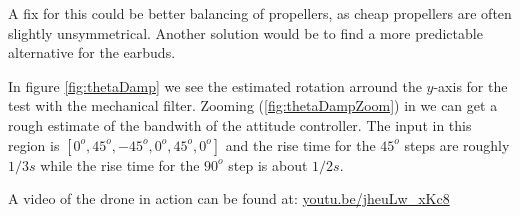 A fix for this could be better balancing of propellers, as cheap propellers are
often slightly unsymmetrical. Another solution would be to find a more
predictable alternative for the earbuds.

In figure \ref{fig:thetaDamp} we see the estimated rotation arround the
$y$-axis for the test with the mechanical filter. Zooming
(\ref{fig:thetaDampZoom}) in we can get a rough estimate of the bandwith of the
attitude controller. The input in this region is $[0^o, 45^o, -45^o, 0^o, 45^o,
0^o]$ and the rise time for the $45^o$ steps are roughly $1/3 s$ while the rise
time for the $90^o$ step is about $1/2 s$.



A video of the drone in action can be found at: \url{youtu.be/jheuLw_xKc8}

%
%






